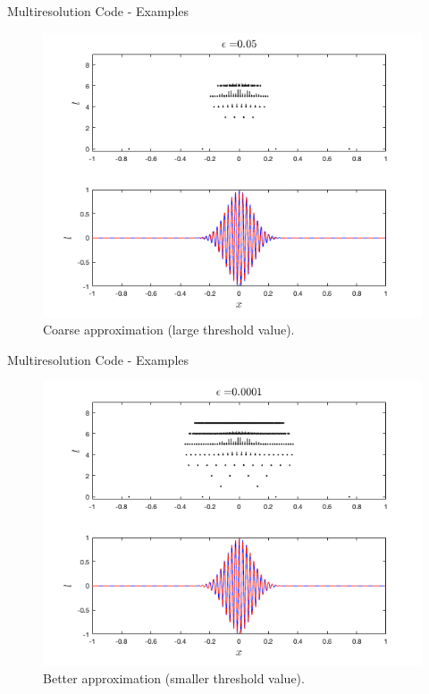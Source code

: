 \documentclass{beamer}
\begin{document}
\begin{frame}[shrink=15]{Multiresolution Code - Examples}
	\begin{figure}
		\center
		\includegraphics[scale=0.5]{plots/wiggle-low.png}
		\caption{Coarse approximation (large threshold value).}
	\end{figure}	
\end{frame}


\begin{frame}[shrink=15]{Multiresolution Code - Examples}
	\begin{figure}
		\center
		\includegraphics[scale=0.5]{plots/wiggle-med.png}
		\caption{Better approximation (smaller threshold value).}
	\end{figure}	
\end{frame}
\end{document}
